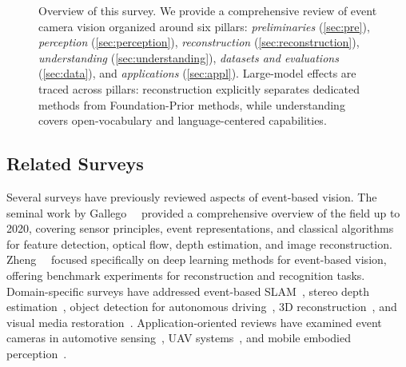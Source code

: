 \begin{figure}[t]
\caption{Overview of this survey. We provide a comprehensive review of event camera vision organized around six pillars: \textit{preliminaries} (\cref{sec:pre}), \textit{perception} (\cref{sec:perception}), \textit{reconstruction} (\cref{sec:reconstruction}), \textit{understanding} (\cref{sec:understanding}), \textit{datasets and evaluations} (\cref{sec:data}), and \textit{applications} (\cref{sec:appl}). Large-model effects are traced across pillars: reconstruction explicitly separates dedicated methods from Foundation-Prior methods, while understanding covers open-vocabulary and language-centered capabilities.}
\label{fig:overview}
\end{figure}


\subsection{Related Surveys}
\label{sec:intro_related}

Several surveys have previously reviewed aspects of event-based vision. The seminal work by Gallego~\etal~\cite{gallego2022survey} provided a comprehensive overview of the field up to 2020, covering sensor principles, event representations, and classical algorithms for feature detection, optical flow, depth estimation, and image reconstruction. Zheng~\etal~\cite{zheng2024deeplearning} focused specifically on deep learning methods for event-based vision, offering benchmark experiments for reconstruction and recognition tasks. Domain-specific surveys have addressed event-based SLAM~\cite{huang2023eslam}, stereo depth estimation~\cite{ghosh2025stereodepth}, object detection for autonomous driving~\cite{zhou2024detection}, 3D reconstruction~\cite{xu2025recon3d}, and visual media restoration~\cite{kar2025restoration}. Application-oriented reviews have examined event cameras in automotive sensing~\cite{shariff2024automotive}, UAV systems~\cite{akanbi2025uav}, and mobile embodied perception~\cite{wang2025mobile}.

